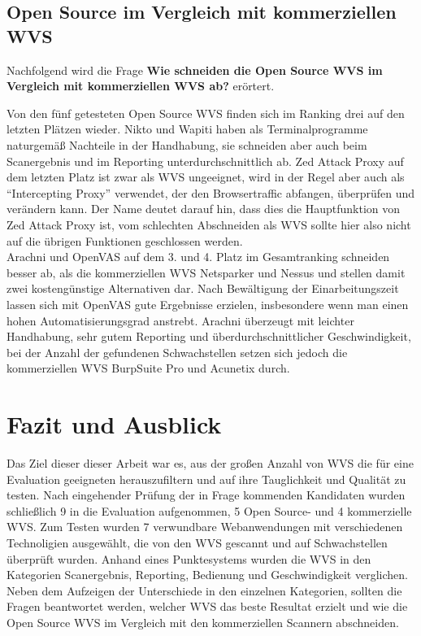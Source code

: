 \documentclass[12pt,oneside,a4paper,parskip]{scrbook}
\begin{document}
  \section{Open Source im Vergleich mit kommerziellen WVS}
  Nachfolgend wird die Frage \textbf{Wie schneiden die Open Source WVS im Vergleich mit kommerziellen WVS ab?} erörtert.

  Von den fünf getesteten Open Source WVS finden sich im Ranking drei auf den letzten Plätzen wieder. Nikto und Wapiti haben als Terminalprogramme naturgemäß Nachteile in der Handhabung, sie schneiden aber auch beim Scanergebnis und im Reporting unterdurchschnittlich ab. Zed Attack Proxy auf dem letzten Platz ist zwar als WVS ungeeignet, wird in der Regel aber auch als ``Intercepting Proxy'' verwendet, der den Browsertraffic abfangen, überprüfen und verändern kann. Der Name deutet darauf hin, dass dies die Hauptfunktion von Zed Attack Proxy ist, vom schlechten Abschneiden als WVS sollte hier also nicht auf die übrigen Funktionen geschlossen werden.\\
  Arachni und OpenVAS auf dem 3. und 4. Platz im Gesamtranking schneiden besser ab, als die kommerziellen WVS Netsparker und Nessus und stellen damit zwei kostengünstige Alternativen dar. Nach Bewältigung der Einarbeitungszeit lassen sich mit OpenVAS gute Ergebnisse erzielen, insbesondere wenn man einen hohen Automatisierungsgrad anstrebt.
  Arachni überzeugt mit leichter Handhabung, sehr gutem Reporting und überdurchschnittlicher Geschwindigkeit, bei der Anzahl der gefundenen Schwachstellen setzen sich jedoch die kommerziellen WVS BurpSuite Pro und Acunetix durch.


\chapter{Fazit und Ausblick}
Das Ziel dieser dieser Arbeit war es, aus der großen Anzahl von WVS die für eine Evaluation geeigneten herauszufiltern und auf ihre Tauglichkeit und Qualität zu testen. Nach eingehender Prüfung der in Frage kommenden Kandidaten wurden schließlich 9 in die Evaluation aufgenommen, 5 Open Source- und 4 kommerzielle WVS.
Zum Testen wurden 7 verwundbare Webanwendungen mit verschiedenen Technoligien ausgewählt, die von den WVS gescannt und auf Schwachstellen überprüft wurden. Anhand eines Punktesystems wurden die WVS in den Kategorien Scanergebnis, Reporting, Bedienung und Geschwindigkeit verglichen.\\
Neben dem Aufzeigen der Unterschiede in den einzelnen Kategorien, sollten die Fragen beantwortet werden, welcher WVS das beste Resultat erzielt und wie die Open Source WVS im Vergleich mit den kommerziellen Scannern abschneiden.
\end{document}
